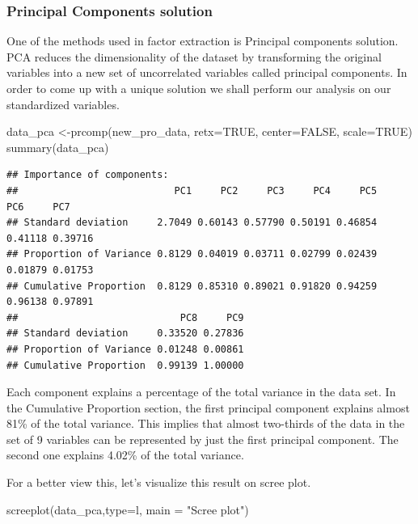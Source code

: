 \documentclass[
]{article}
\newenvironment{Shaded}{\begin{snugshade}}{\end{snugshade}}
\newcommand{\AttributeTok}[1]{\textcolor[rgb]{0.77,0.63,0.00}{#1}}
\newcommand{\ConstantTok}[1]{\textcolor[rgb]{0.00,0.00,0.00}{#1}}
\newcommand{\FunctionTok}[1]{\textcolor[rgb]{0.00,0.00,0.00}{#1}}
\newcommand{\NormalTok}[1]{#1}
\newcommand{\OtherTok}[1]{\textcolor[rgb]{0.56,0.35,0.01}{#1}}
\newcommand{\StringTok}[1]{\textcolor[rgb]{0.31,0.60,0.02}{#1}}
\begin{document}
\hypertarget{principal-components-solution}{%
\subsubsection{Principal Components
solution}\label{principal-components-solution}}

One of the methods used in factor extraction is Principal components
solution. PCA reduces the dimensionality of the dataset by transforming
the original variables into a new set of uncorrelated variables called
principal components. In order to come up with a unique solution we
shall perform our analysis on our standardized variables.

\begin{Shaded}
\begin{Highlighting}[]
\NormalTok{data\_pca }\OtherTok{\textless{}{-}}\FunctionTok{prcomp}\NormalTok{(new\_pro\_data, }\AttributeTok{retx=}\ConstantTok{TRUE}\NormalTok{, }\AttributeTok{center=}\ConstantTok{FALSE}\NormalTok{, }\AttributeTok{scale=}\ConstantTok{TRUE}\NormalTok{)}
\FunctionTok{summary}\NormalTok{(data\_pca)}
\end{Highlighting}
\end{Shaded}

\begin{verbatim}
## Importance of components:
##                           PC1     PC2     PC3     PC4     PC5     PC6     PC7
## Standard deviation     2.7049 0.60143 0.57790 0.50191 0.46854 0.41118 0.39716
## Proportion of Variance 0.8129 0.04019 0.03711 0.02799 0.02439 0.01879 0.01753
## Cumulative Proportion  0.8129 0.85310 0.89021 0.91820 0.94259 0.96138 0.97891
##                            PC8     PC9
## Standard deviation     0.33520 0.27836
## Proportion of Variance 0.01248 0.00861
## Cumulative Proportion  0.99139 1.00000
\end{verbatim}

Each component explains a percentage of the total variance in the data
set. In the Cumulative Proportion section, the first principal component
explains almost 81\% of the total variance. This implies that almost
two-thirds of the data in the set of 9 variables can be represented by
just the first principal component. The second one explains 4.02\% of
the total variance.

For a better view this, let's visualize this result on scree plot.

\begin{Shaded}
\begin{Highlighting}[]
\FunctionTok{screeplot}\NormalTok{(data\_pca,}\AttributeTok{type=}\StringTok{\textquotesingle{}l\textquotesingle{}}\NormalTok{, }\AttributeTok{main =} \StringTok{"Scree plot"}\NormalTok{)}
\end{Highlighting}
\end{Shaded}
\end{document}
